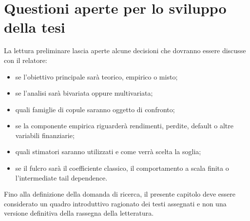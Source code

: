 \documentclass[12pt,a4paper,oneside]{book}
\begin{document}
\section{Questioni aperte per lo sviluppo della tesi}

La lettura preliminare lascia aperte alcune decisioni che dovranno essere
discusse con il relatore:

\begin{itemize}
    \item se l'obiettivo principale sarà teorico, empirico o misto;
    \item se l'analisi sarà bivariata oppure multivariata;
    \item quali famiglie di copule saranno oggetto di confronto;
    \item se la componente empirica riguarderà rendimenti, perdite, default o
          altre variabili finanziarie;
    \item quali stimatori saranno utilizzati e come verrà scelta la soglia;
    \item se il fulcro sarà il coefficiente classico, il comportamento a scala
          finita o l'intermediate tail dependence.
\end{itemize}

Fino alla definizione della domanda di ricerca, il presente capitolo deve
essere considerato un quadro introduttivo ragionato dei testi assegnati e non
una versione definitiva della rassegna della letteratura.

\printbibliography
\end{document}
